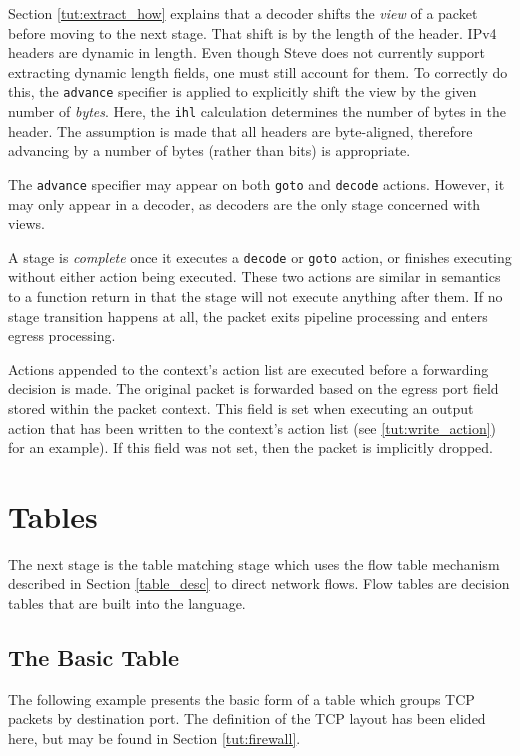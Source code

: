 Section \ref{tut:extract_how} explains that a decoder shifts the
\textit{view} of a packet before moving to the next stage. That shift is by the
length of the header. IPv4 headers are dynamic in length. Even though Steve does not
currently support extracting dynamic length fields, one must still account for
them. To correctly do this, the \texttt{advance} specifier is applied to
explicitly shift the view by the given number of \textit{bytes}. 
Here, the \texttt{ihl} calculation determines the number of bytes in the header.
The assumption is made that all headers are byte-aligned, therefore advancing by
a number of bytes (rather than bits) is appropriate. 

The \texttt{advance} specifier may appear on both \texttt{goto} and \texttt{decode} actions. However, it may only appear in a decoder, as decoders are the only
stage concerned with views.

A stage is \textit{complete} once it executes a \texttt{decode} or \texttt{goto} action, or
finishes executing without either action being executed. 
These two actions are similar in semantics to a function return
in that the stage will not execute anything after them.
If no stage transition happens at all,
the packet exits pipeline processing and enters egress processing.

Actions appended to the context's action list are executed before a forwarding decision is made.
The original packet is forwarded based on the egress port field stored
within the packet context. This field is set when executing an
output action that has been written to the context's action list
(see \ref{tut:write_action}) for an example). If this field was not set,
then the packet is implicitly dropped.

\section{Tables} \label{tut:table}

The next stage is the table matching stage which uses the flow table mechanism described in Section \ref{table_desc} to direct network flows. Flow tables are decision tables that are built into the language.

\subsection{The Basic Table} \label{tut:basic_table}

The following example presents the basic form of a table which
groups TCP packets by destination port. The definition of the TCP
layout has been elided here, but may be found in Section \ref{tut:firewall}.

